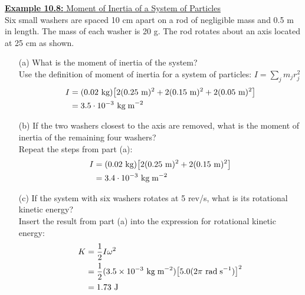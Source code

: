 \documentclass[a4paper]{article}
\let\bf\textbf
\newcommand\rads{\text{ rad\;s}^{-1}}
\newcommand\m{\text{ m}}
\newcommand\J{\text{ J}}
\newcommand\kg{\text{ kg}}
\newcommand\kgmm{\text{ kg\;m}^{-2}}
\def\centerarc[#1](#2)(#3:#4:#5){\draw[#1] ($(#2)+({#5*cos(#3)},{#5*sin(#3)})$) arc (#3:#4:#5)}
\begin{document}
\newpage
\begin{shaded}
    \underline{\bf{Example 10.8:} Moment of Inertia of a System of Particles}
    \vspace{2mm}\\
    Six small washers are spaced 10 cm apart on a rod of negligible mass and 0.5 m in length. The mass of each washer is 20 g. The rod rotates about an axis located at 25 cm as shown.
    \begin{center}
    \end{center}
    \begin{enumerate}
        \item[(a)] What is the moment of inertia of the system?
        \vspace{1mm}\\
        Use the definition of moment of inertia for a system of particles: $I = \sum\limits_j m_jr^2_j$
        \begin{align*}
            I &= (0.02\kg)\big[2(0.25\m)^2 + 2(0.15\m)^2 + 2(0.05\m)^2\big]\\
            &= 3.5 \cdot 10^{-3}\kgmm
        \end{align*}
        \item[(b)] If the two washers closest to the axis are removed, what is the moment of inertia of the remaining four washers?
        \vspace{1mm}\\
        Repeat the steps from part (a):
        \begin{align*}
            I &= (0.02\kg)\big[2(0.25\m)^2 + 2(0.15\m)^2\big]\\
            &= 3.4 \cdot 10^{-3}\kgmm
        \end{align*}
        \item[(c)] If the system with six washers rotates at 5 rev/s, what is its rotational kinetic energy?
        \vspace{1mm}\\
        Insert the result from part (a) into the expression for rotational kinetic energy:
        \begin{align*}
            K &= \frac{1}{2}I\omega^2\\
            &= \frac{1}{2}(3.5 \times 10^{-3}\kgmm)\big[5.0(2\pi\rads)\big]^2\\
            &= 1.73\J
        \end{align*}
    \end{enumerate}
\end{shaded}
\end{document}
